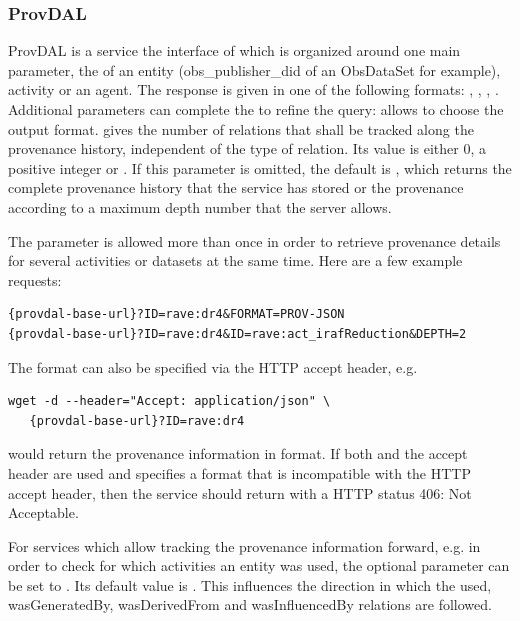 \subsubsection{ProvDAL}
ProvDAL is a service the interface of which is organized around one main parameter, the  of an entity (obs\_publisher\_did of an ObsDataSet for example), activity or an agent.
The response is given in one of the following formats: , , , .
Additional parameters can complete the  to refine the query:  allows to choose the output format.  gives the number of relations that shall be tracked along the provenance history, independent of the type of relation. Its value is either 0, a positive integer or . If this parameter is omitted, the default is , which returns the complete provenance history that the service has stored or the provenance according to a maximum depth number that the server allows.

The  parameter is allowed more than once in order to retrieve provenance details for several activities or datasets at the same time. Here are a few example requests:

\begin{verbatim}
{provdal-base-url}?ID=rave:dr4&FORMAT=PROV-JSON
{provdal-base-url}?ID=rave:dr4&ID=rave:act_irafReduction&DEPTH=2
\end{verbatim}

\noindent
The format can also be specified via the HTTP accept header, e.g.
\begin{verbatim}
wget -d --header="Accept: application/json" \
   {provdal-base-url}?ID=rave:dr4
\end{verbatim}
would return the provenance information in  format.
\noindent
If both  and the accept header are used and  specifies a format that is incompatible with the HTTP accept header, then the service should return with a HTTP status 406: Not Acceptable.

For services which allow tracking the provenance information forward, e.g. in order to check for which activities an entity was used, the optional parameter  can be set to . Its default value is . This influences the direction in which the used, wasGeneratedBy, wasDerivedFrom and wasInfluencedBy relations are followed.

